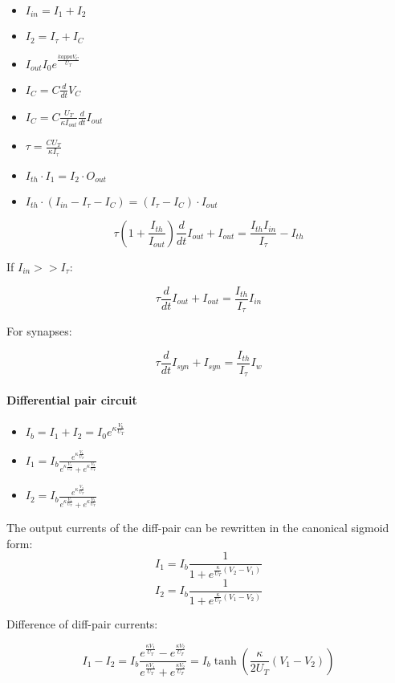 \documentclass[main]{subfiles}
\begin{document}
\begin{itemize}
	\item $I_{in}=I_1+I_2$
	\item $I_2 = I_\tau + I_C$
	\item $I_{out} I_0 e^{\frac{kappa V_C}{U_T}}$
	\item $I_C = C\frac{d}{dt}V_C$
	\item $I_C = C \frac{U_T}{\kappa I_{out}} \frac{d}{dt}I_{out}$
	\item $\tau = \frac{CU_T}{\kappa I_\tau}$
	\item $I_{th} \cdot  I_1 = I_2 \cdot O_{out}$
	\item $I_{th} \cdot (I_{in} - I_\tau - I_C) = (I_\tau - I_C) \cdot I_{out}$
\end{itemize}

\[\tau(1 + \frac{I_{th}}{I_{out}}) \frac{d}{dt} I_{out} + I_{out}= \frac{I_{th} I_{in}}{I_\tau} - I_{th}\]

If $I_{in} >> I_{\tau}$:

\[\tau \frac{d}{dt} I_{out} + I_{out} = \frac{I_{th}}{I_\tau} I_{in}\]

For synapses:

\[\tau \frac{d}{dt} I_{syn} + I_{syn} = \frac{I_{th}}{I_\tau} I_{w}\]

\paragraph{Differential pair circuit}
\begin{itemize}
	\item $I_b = I_1 + I_2 = I_0 e^{\kappa \frac{V_b}{U_T}}$
	\item $I_1=I_b\frac{e^{\kappa \frac{V_1}{U_T}}}{e^{\kappa \frac{V_1}{U_T}}+e^{\kappa \frac{V_2}{U_T}}}$
	\item $I_2=I_b\frac{e^{\kappa \frac{V_2}{U_T}}}{e^{\kappa \frac{V_1}{U_T}}+e^{\kappa \frac{V_2}{U_T}}}$
\end{itemize}

The output currents of the diff-pair can be rewritten in the canonical sigmoid
form:
\[I_1=I_b\frac{1}{1 + e^{\frac{\kappa}{U_T} (V_2 - V_1)}}\]
\[I_2=I_b\frac{1}{1 + e^{\frac{\kappa}{U_T} (V_1 - V_2)}}\]

Difference of diff-pair currents:

\[I_1 - I_2 = I_b \frac{e^{\frac{\kappa V_1}{U_T}} - e^{\frac{\kappa V_2}{U_T}}}{e^{\frac{\kappa V_1}{U_T}} + e^{\frac{\kappa V_2}{U_T}}} = I_b \tanh(\frac{\kappa}{2U_T}(V_1 - V_2))\]
\end{document}
